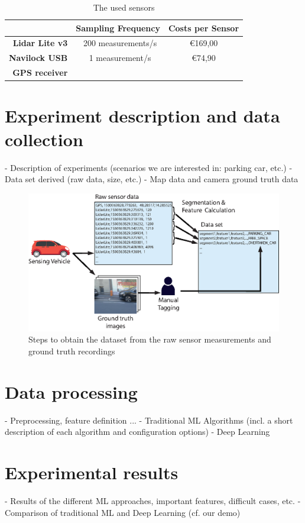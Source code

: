 \begin{table}

\bgroup
\def\arraystretch{1.5}
\begin{tabular}{| r || c | c |}
\hline
   & 
   \textbf{Sampling Frequency} & 
   \textbf{Costs per Sensor} \\
\hline
  \textbf{Lidar Lite v3} & 
   ~200 measurements/s &
   \euro{169,00} \\
\hline
  \textbf{Navilock USB} & 
   ~1 measurement/s &
   \euro{74,90} \\
   \textbf{GPS receiver} & & \\
\hline

\end{tabular}
\egroup

\caption{The used sensors}
\label{table:sensors_capabilities}
\end{table}


\section{Experiment description and data collection}
\label{sec:experiment_description_data_collection}
- Description of experiments (scenarios we are interested in: parking car, etc.)
- Data set derived (raw data, size, etc.)
- Map data and camera ground truth data

\begin{figure}
	\centering
	\includegraphics[width=\textwidth]{img/obtaining-dataset-architecture.eps}
	\caption{Steps to obtain the dataset from the raw sensor measurements and ground truth recordings}
	\label{fig:dataset_architecture}
\end{figure}

\section{Data processing}
\label{sec:data_processing}
- Preprocessing, feature definition ...
- Traditional ML Algorithms (incl. a short description of each algorithm and configuration options)
- Deep Learning

\section{Experimental results}
- Results of the different ML approaches, important features, difficult cases, etc.
- Comparison of traditional ML and Deep Learning (cf. our demo)